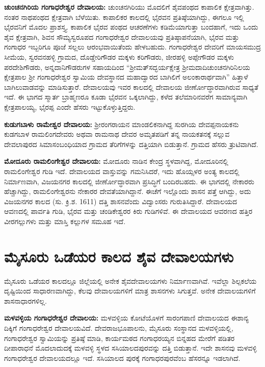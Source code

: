 \textbf{ಚುಂಚನಗಿರಿಯ ಗಂಗಾಧರೇಶ್ವರ ದೇವಾಲಯ:} ಚುಂಚನಗಿರಿಯು ಮೊದಲಿಗೆ ಶೈವಪಂಥದ ಕಾಪಾಲಿಕ ಕ್ಷೇತ್ರವಾಗಿತ್ತು. ನಂತರ ನಾಥಪಂಥದ ಕ್ಷೇತ್ರವಾಗಿ ಬೆಳೆಯಿತು. ಕಾಪಾಲಿಕರ ಕಾಲದಲ್ಲಿ ಭೈರವನ ಪ್ರತಿಷ್ಠೆಯಾಗಿದ್ದು, ಈಗಲೂ ಇಲ್ಲಿ ಭೈರವನಿಗೆ ಮೊದಲ ಪ್ರಾಶಸ್ತ್ಯ. ಕಾಪಾಲಿಕ ಭೈರವ ಪಂಥದ ಆಚರಣೆಗಳು ಕಡಿಮೆಯಾಗುತ್ತಾ ಬಂದಹಾಗೆ, ಇದು ಒಂದು ಶೈವ ಕ್ಷೇತ್ರವಾಗಿ, ಶಿವನ ಸೌಮ್ಯಸ್ವರೂಪದ ಗಂಗಾಧರೇಶ್ವರ ದೇವಾಲಯವು ಪ್ರತಿಷ್ಠಾಪನೆಯಾಗಿ, ಭೈರವ ಮತ್ತು ಗಂಗಾಧರ ಇಬ್ಬರಿಗೂ ಪೂಜೆ ಸಲ್ಲಲು ಆರಂಭವಾಯಿತೆಂದು ಹೇಳಬಹುದು. ಗಂಗಾಧರೇಶ್ವರ ದೇವರಿಗೆ ಮಾಯಸಮುದ್ರ ಸೀಮೆಯ, ಸ್ವರವನಹಳ್ಳಿ ಗ್ರಾಮದ, ದೊಡ್ಡೇರಿಗೌಡರ ಮಕ್ಕಳು ಕರಿಗೌಡರು, ಜೀರಹಳ್ಳಿ ಅಪ್ಪೇಗೌಡರ ಮಕ್ಕಳು ಪರದೇಶಿಗೌಡರು, ಅನ್ನದಾನಿಗೌಡರುಗಳ ಸಹಾಯದಿಂದ “ಶ‍್ರೀಮತ್​ಸದ್ಭರ್ಯಕ್ಷೇತ್ರ ಶ‍್ರೀಮದಾದಿಚುಂಚನಗಿರಿನಿಲಯ ಕ್ಷೇತ್ರಪಾಲ ಶ‍್ರೀ ಗಂಗಾಧರೇಶ್ವರ ಸ್ವಾಮಿಯ ದೇವಸ್ಥಾನದ ಮಹಾದ್ವಾರದ ಬಾಗಿಲಿಗೆ ಅಲಂಕಾರಾರ್ಥವಾಗಿ” ಹಿತ್ತಾಳೆ ಬಾಗಿಲುವಾಡವನ್ನು ಮಾಡಿಸುತ್ತಾರೆ. ದೇವಾಲಯವು ಇವರ ಕಾಲದಲ್ಲಿ ದೇವಾಲಯ ಜೀರ್ಣೋದ್ಧಾರವಾಗಿರುವ ಸಾಧ್ಯತೆ ಇದೆ. ಈ ಭಾಗದ ಸ್ಮಾರ್ತ ಬ್ರಾಹ್ಮಣರೂ ಕೂಡಾ ಭೈರವನ ಒಕ್ಕಲಾಗಿದ್ದು, ಕಳೆದ ತಲೆಮಾರಿನವರೆಗ ಸಾಮಾನ್ಯವಾಗಿ ಕ್ಷೇತ್ರಪಾಲಯ್ಯ, ಭೈರಪ್ಪ ಎಂದೇ ಹೆಸರು ಇಟ್ಟುಕೊಳ್ಳುತ್ತಿದ್ದರು.

\textbf{ಕುಡುಗಬಾಳು ರಾಮೇಶ್ವರ ದೇವಾಲಯ:} ಶ‍್ರೀರಂಗರಾಯನ ಮಾಂಡಲಿಕನಾಗಿದ್ದ ಸುರಗಿಯ ದೇವಪ್ಪನಾಯಕನು ಕುಡಗಬಾಳ ರಾಮಲಿಂಗದೇವರು ಅಥವಾ ರಾಮನಾಥ ದೇವರ ಅಮೃತಪಡಿಗೆ ತನ್ನ ನಾಯಕತನಕ್ಕೆ ಸಲ್ಲುವ ದೇವಲಾಪುರದ ಸಿಮಾಸಂಬಂಧಿಯಾದ ಗ್ರಾಮದ ತೆರಿಗೆಗಳನ್ನು ದತ್ತಿಯಾಗಿ ಬಿಡುತ್ತಾನೆ. ಗ್ರಾಮದ ಹೆಸರು ತ್ರುಟಿವಾಗಿದೆ.

\textbf{ಮೋದೂರು ರಾಮಲಿಂಗೇಶ್ವರ ದೇವಾಲಯ:} ಮೋದೂರು ನಾಡಿನ ಕೇಂದ್ರ ಸ್ಥಳವಾಗಿದ್ದ, ಮೋದೂರಿನಲ್ಲಿ ರಾಮಲಿಂಗೇಶ್ವರ ಗುಡಿ ಇದೆ. ದೇವಾಲಯದ ವಾಸ್ತುವನ್ನು ಗಮನಿಸಿದರೆ, ಇದು ಹೊಯ್ಸಳರ ಅಂತ್ಯ ಕಾಲದಲ್ಲಿ ನಿರ್ಮಾಣವಾಗಿ, ವಿಜಯನಗರ ಕಾಲದಲ್ಲಿ ಜೀರ್ಣೋದ್ಧಾರವಾಗಿ ಪ್ರಸಿದ್ಧಿಗೆ ಬಂದಿರಬಹದು. ಈ ಭಾಗದಲ್ಲಿ ನೇಕಾರರು ಹೆಚ್ಚಾಗಿದ್ದು, ರಾಮಲಿಂಗೇಶ್ವರನು ನೇಕಾರರ ದೇವತೆಯಾಗಿದ್ದಾನೆ. ಈಚೆಗೆ ಇಲ್ಲೊಂದು ಶಾಸನ ಪತ್ತೆ ಆಗಿದ್ದು, ಅದು ವಿಜಯನಗರ ಕಾಲದ (ಸು. ಕ್ರಿ.ಶ. 1611) ದತ್ತಿ ಶಾಸನವೆಂದು ವಿದ್ವಾಂಸರು ಗುರುತಿಸಿದ್ದಾರೆ. ದೇವಾಲಯದ ಆವಣದಲ್ಲಿ ಪಾರ್ವತಿ ಗುಡಿ, ಭೈರವ ಮತ್ತು ಚಂಡಿಕೇಶ್ವರರ ಕಿರು ಗುಡಿಗಳಿವೆ. ಈ ದೇವಾಲಯದ ಆವರಣದ ಹತ್ತಿರ ವೀರಗಲ್ಲುಗಳು ಮತ್ತು ಮಾಸ್ತಿ ಕಲ್ಲುಗಳ ಸಮೂಹ ಇದೆ.


\section{ಮೈಸೂರು ಒಡೆಯರ ಕಾಲದ ಶೈವ ದೇವಾಲಯಗಳು}

ಮೈಸೂರು ಒಡೆಯರ ಕಾಲದಲ್ಲೂ ಜಿಲ್ಲೆಯಲ್ಲಿ ಅನೇಕ ಶೈವದೇವಾಲಯಗಳು ನಿರ್ಮಾಣವಾಗಿವೆ. ಇವೆಲ್ಲಾ ಶಿಲ್ಪಕಲೆಯ ದೃಷ್ಟಿಯಿಂದ ಸಾಧಾರಣವಾಗಿದ್ದು, ಕೆಲವು ದೇವಾಲಯಗಳಿಗೆ ಮಾತ್ರ ಶಾಸನಗಳು ಸಿಗುತ್ತವೆ. ಅನೇಕ ದೇವಾಲಯಗಳಿಗೆ ಶಾಸನಾಧಾರಗಳಿಲ್ಲ. 

\textbf{ಮಳವಳ್ಳಿಯ ಗಂಗಾಧರೇಶ್ವರ ದೇವಾಲಯ:} ಮಳವಳ್ಳಿಯ ಕೋಟೆಯೊಳಗೆ ಸಾರಂಗಪಾಣಿ ದೇವಾಲಯದ ಈಶಾನ್ಯ ದಿಕ್ಕಿಗೆ ಗಂಗಾಧರೇಶ್ವರ ದೇವಾಲಯವಿದೆ. ದೇವರಾಜಭೂಪಾಲನು, ಮೈಸೂರು ಸಂಸ್ಥಾನದ ಮಳವಳ್ಳಿಯಲ್ಲಿ, ಗಂಗಾಧರೇಶ್ವರ ಸ್ವಾಮಿಯನ್ನು ಪ್ರತಿಷ್ಠೆ ಮಾಡಿ, ಕಾರ್ಯಮಠದ ಗಂಗಾಧರಯ್ಯನ ಬಿನ್ನಹದ ಮೇರೆಗೆ ಪಡಿತರ ದೀಪಾರಾಧನೆ ಮೊದಲಾದುದಕ್ಕೆ ಮಳವಳ್ಳಿ ಸ್ಥಳದ ಸಸಿಯಾಲದಪುರವನ್ನು ದತ್ತಿ ಬಿಡುತ್ತಾನೆ. ಇದೇ ಶಾಸನವು ಮಳವಳ್ಳಿ ಗಂಗಾಧರೇಶ್ವರ ದೇವಾಲಯದಲ್ಲೂ ಇದೆ. ಸಸಿಯಾಲದ ಪುರಕ್ಕೆ ಗಂಗಾಧರಪುರವೆಂಬ ಹೆಸರನ್ನೂ ಇಡಲಾಗಿದೆ.

